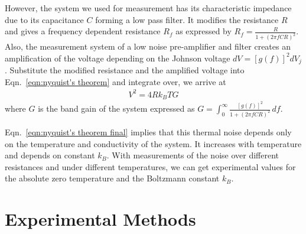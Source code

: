 \documentclass[12pt]{article}
\begin{document}
However, the system we used for measurement has its characteristic impedance due to its capacitance $C$ forming a low pass filter. It modifies the resistance $R$ and gives a frequency dependent resistance $R_f$ as expressed by $R_f=\frac{R}{1+(2\pi fCR)^2}$.
Also, the measurement system of a low noise pre-amplifier and filter creates an amplification of the voltage depending on the Johnson voltage $dV=[g(f)]^2dV_j$.
Substitute the modified resistance and the amplified voltage into Eqn.~\ref{eqn:nyquist's theorem} and integrate over, we arrive at
\begin{gather}
V^2=4Rk_BTG
\label{eqn:nyquist's theorem final}
\end{gather}
where $G$ is the band gain of the system expressed as $G=\int_{0}^{\infty} \frac{[g(f)]^2}{1+(2\pi fCR)^2} \,df$.

 Eqn.~\ref{eqn:nyquist's theorem final} implies that this thermal noise depends only on the temperature and conductivity of the system. It increases with temperature and depends on constant $k_B$. With measurements of the noise over different resistances and under different temperatures, we can get experimental values for the absolute zero temperature and the Boltzmann constant $k_B$.

\section{Experimental Methods}
\end{document}
